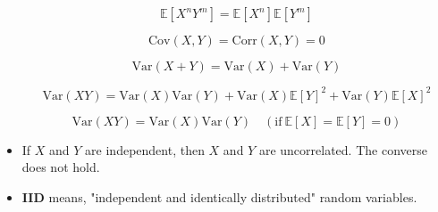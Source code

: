 \begin{concept}
\begin{itemize}
        $$
        \mathbb{E}[X^n Y^m] = \mathbb{E}[X^n] \mathbb{E}[Y^m]
        $$

        $$
        \text{Cov}(X, Y) = \text{Corr}(X, Y) = 0
        $$

        $$
        \text{Var}(X+Y) = \text{Var}(X) + \text{Var}(Y)
        $$

        $$
        \text{Var}(XY) = \text{Var}(X)\text{Var}(Y) + \text{Var}(X)\mathbb{E}[Y]^2 + \text{Var}(Y)\mathbb{E}[X]^2
        $$

        $$
        \text{Var}(XY) = \text{Var}(X)\text{Var}(Y) \quad (\text{if} \ \mathbb{E}[X]=\mathbb{E}[Y]=0)
        $$
        \item If $X$ and $Y$ are independent, then $X$ and $Y$ are uncorrelated. The converse does not hold.
        \item \textbf{IID} means, "independent and identically distributed" random variables.
    \end{itemize}
\end{concept}


